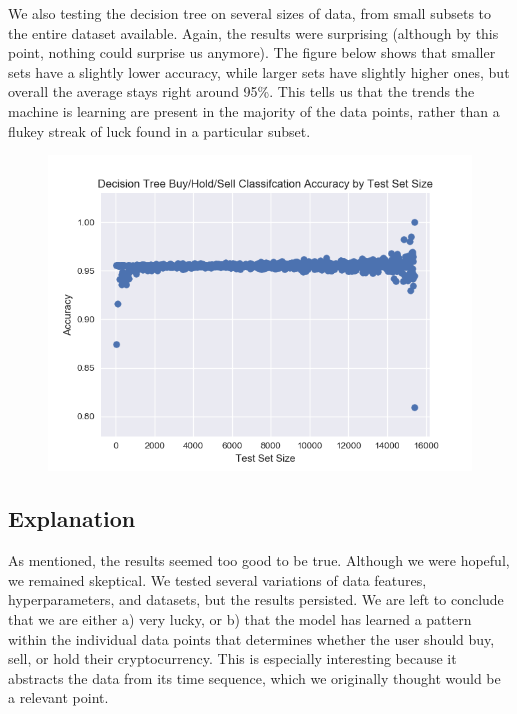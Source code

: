 \documentclass{article}
\begin{document}
We also testing the decision tree on several sizes of data, from small subsets to the entire dataset available. Again, the results were surprising (although by this point, nothing could surprise us anymore). The figure below shows that smaller sets have a slightly lower accuracy, while larger sets have slightly higher ones, but overall the average stays right around 95\%. This tells us that the trends the machine is learning are present in the majority of the data points, rather than a flukey streak of luck found in a particular subset. \\

\begin{figure}
	\includegraphics[scale=0.55 ]{../pic/size.png}
\end{figure}

\subsection{ Explanation }

As mentioned, the results seemed too good to be true. Although we were hopeful, we remained skeptical. We tested several variations of data features, hyperparameters, and datasets, but the results persisted. We are left to conclude that we are either a) very lucky, or b) that the model has learned a pattern within the individual data points that determines whether the user should buy, sell, or hold their cryptocurrency. This is especially interesting because it abstracts the data from its time sequence, which we originally thought would be a relevant point. \\
\end{document}
